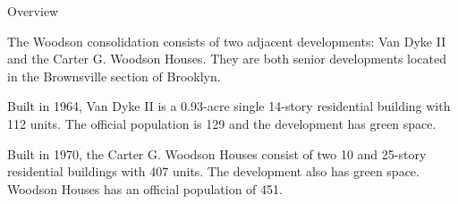 Overview

The Woodson consolidation consists of two adjacent developments: Van Dyke II and the Carter G. Woodson Houses. They are both senior developments located in the Brownsville section of Brooklyn. 

Built in 1964, Van Dyke II is a 0.93-acre single 14-story residential building with 112 units. The official population is 129 and the development has green space. 

Built in 1970, the Carter G. Woodson Houses consist of two 10 and 25-story residential buildings with 407 units. The development also has green space. Woodson Houses has an official population of 451.